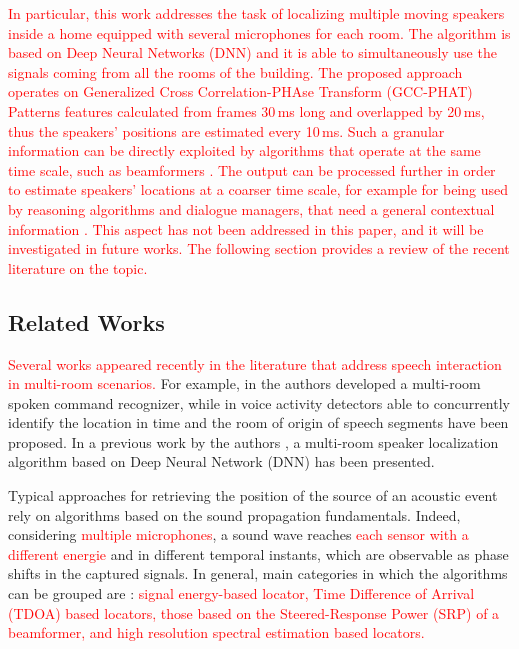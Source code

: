 \documentclass[review]{elsarticle}
\begin{document}
\textcolor{red}{In particular, this work addresses the task of localizing multiple moving speakers inside a home equipped with several microphones for each room. The algorithm is based on Deep Neural Networks (DNN) and it is able to simultaneously use the signals coming from all the rooms of the building. The proposed approach operates on Generalized Cross Correlation-PHAse Transform (GCC-PHAT) Patterns \cite{xiao2015learning} features calculated from frames 30\,ms long and overlapped by 20\,ms, thus the speakers' positions are estimated every 10\,ms. Such a granular information can be directly exploited by algorithms that operate at the same time scale, such as beamformers \cite{Wolfel2009}. The output can be processed further in order to estimate speakers' locations at a coarser time scale, for example for being used by reasoning algorithms and dialogue managers, that need a general contextual information \cite{Augusto2013}. This aspect has not been addressed in this paper, and it will be investigated in future works. The following section provides a review of the recent literature on the topic.
}



\subsection{Related Works}
\textcolor{red}{Several works appeared recently in the literature that address speech interaction in multi-room scenarios.}  For example, in \cite{Rodomagoulakis2017} the authors developed a multi-room spoken command recognizer, while in \cite{ijcnn-vad,vesperini2016deep,Giannoulis2015,Katsamanis2014} voice activity detectors able to concurrently identify the location in time and the room of origin of speech segments have been proposed. In a previous work by the authors \cite{vesperini2016sloc}, a multi-room speaker localization algorithm based on Deep Neural Network (DNN) has been presented.

Typical approaches for retrieving the position of the source of an acoustic event rely on algorithms based on the 
sound propagation fundamentals. Indeed, considering \textcolor{red}{multiple microphones}, a sound wave reaches \textcolor{red}{each sensor with a different energie} and in different temporal instants, which are observable as phase shifts in the captured signals.  %
In general, main categories in which the algorithms can be grouped are \cite{Cobos2017,Meng2017,Dibiase2001Robust}: \textcolor{red}{signal energy-based locator, Time Difference of Arrival (TDOA) based locators, those based on the Steered-Response Power (SRP) of a beamformer, and high resolution spectral estimation based locators. }
\end{document}
